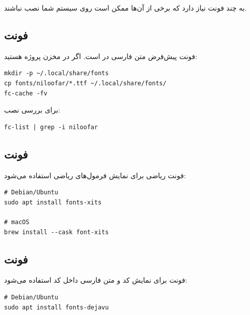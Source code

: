  به چند فونت نیاز دارد که برخی
از آن‌ها ممکن است روی سیستم شما نصب نباشند.

\subsection{فونت }
\label{sec:installation-font-niloofar}

 فونت پیش‌فرض متن فارسی در
 است. اگر در مخزن پروژه هستید:

\begin{latin}
\begin{verbatim}
mkdir -p ~/.local/share/fonts
cp fonts/niloofar/*.ttf ~/.local/share/fonts/
fc-cache -fv
\end{verbatim}
\end{latin}


برای بررسی نصب:

\begin{latin}
\begin{verbatim}
fc-list | grep -i niloofar
\end{verbatim}
\end{latin}

\subsection{فونت }
\label{sec:installation-font-xits}

فونت ریاضی  برای نمایش فرمول‌های
ریاضی استفاده می‌شود:

\begin{latin}
\begin{verbatim}
# Debian/Ubuntu
sudo apt install fonts-xits

# macOS
brew install --cask font-xits
\end{verbatim}
\end{latin}

\subsection{فونت }
\label{sec:installation-font-dejavu}

فونت  برای نمایش کد و
متن فارسی داخل کد استفاده می‌شود:

\begin{latin}
\begin{verbatim}
# Debian/Ubuntu
sudo apt install fonts-dejavu
\end{verbatim}
\end{latin}

